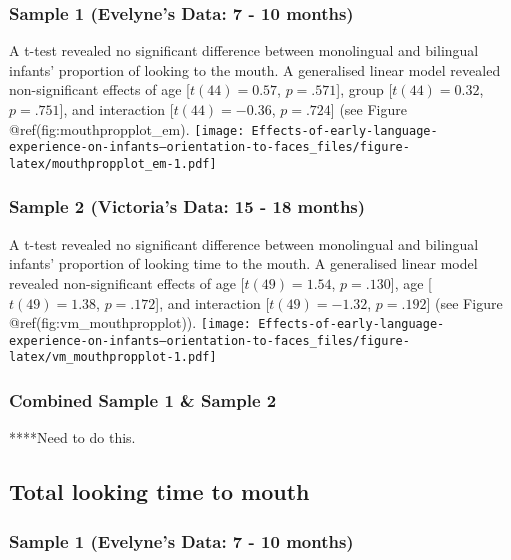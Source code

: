 \documentclass[english,man,floatsintext]{apa6}
\begin{document}
\hypertarget{sample-1-evelynes-data-7---10-months}{%
\subsubsection{Sample 1 (Evelyne's Data: 7 - 10 months)}\label{sample-1-evelynes-data-7---10-months}}

A t-test revealed no significant difference between monolingual and bilingual infants' proportion of looking to the mouth. A generalised linear model revealed non-significant effects of age {[}\(t(44) = 0.57\), \(p = .571\){]}, group {[}\(t(44) = 0.32\), \(p = .751\){]}, and interaction {[}\(t(44) = -0.36\), \(p = .724\){]} (see Figure @ref(fig:mouthpropplot\_em).
\texttt{[image: Effects-of-early-language-experience-on-infants--orientation-to-faces\_files/figure-latex/mouthpropplot\_em-1.pdf]}

\hypertarget{sample-2-victorias-data-15---18-months}{%
\subsubsection{Sample 2 (Victoria's Data: 15 - 18 months)}\label{sample-2-victorias-data-15---18-months}}

A t-test revealed no significant difference between monolingual and bilingual infants' proportion of looking time to the mouth. A generalised linear model revealed non-significant effects of age {[}\(t(49) = 1.54\), \(p = .130\){]}, age {[}\(t(49) = 1.38\), \(p = .172\){]}, and interaction {[}\(t(49) = -1.32\), \(p = .192\){]} (see Figure @ref(fig:vm\_mouthpropplot)).
\texttt{[image: Effects-of-early-language-experience-on-infants--orientation-to-faces\_files/figure-latex/vm\_mouthpropplot-1.pdf]}

\hypertarget{combined-sample-1-sample-2}{%
\subsubsection{Combined Sample 1 \& Sample 2}\label{combined-sample-1-sample-2}}

****Need to do this.

\hypertarget{total-looking-time-to-mouth}{%
\subsection{Total looking time to mouth}\label{total-looking-time-to-mouth}}

\hypertarget{sample-1-evelynes-data-7---10-months-1}{%
\subsubsection{Sample 1 (Evelyne's Data: 7 - 10 months)}\label{sample-1-evelynes-data-7---10-months-1}}
\end{document}
